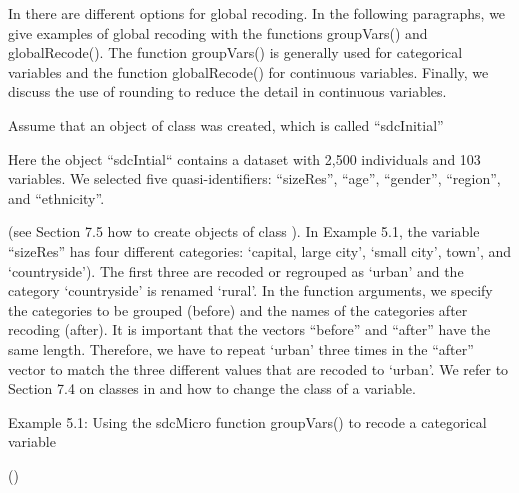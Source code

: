 \documentclass[letterpaper,10pt,english]{sphinxmanual}
\begin{document}
In  there are different options for global recoding. In the
following paragraphs, we give examples of global recoding with the
functions groupVars() and globalRecode(). The function groupVars() is
generally used for categorical variables and the function globalRecode()
for continuous variables. Finally, we discuss the use of rounding to
reduce the detail in continuous variables.


Assume that an object of class  was created, which is called
“sdcInitial” %
\begin{footnote}[2]\sphinxAtStartFootnote
Here the  object “sdcIntial“ contains a dataset with 2,500
individuals and 103 variables. We selected five quasi-identifiers:
“sizeRes”, “age”, “gender”, “region”, and “ethnicity”.
%
\end{footnote} (see Section 7.5 how to create
objects of class ). In Example 5.1, the variable “sizeRes” has
four different categories: ‘capital, large city’, ‘small city’, town’,
and ‘countryside’). The first three are recoded or regrouped as ‘urban’
and the category ‘countryside’ is renamed ‘rural’. In the function
arguments, we specify the categories to be grouped (before) and the
names of the categories after recoding (after). It is important that the
vectors “before” and “after” have the same length. Therefore, we have to
repeat ‘urban’ three times in the “after” vector to match the three
different values that are recoded to ‘urban’.  We refer to
Section 7.4 on classes in  and how to change the class of a variable.

Example 5.1: Using the sdcMicro function groupVars() to recode a
categorical variable

\begin{DUlineblock}{0em}
\item[] 
\item[] ()
\item[] 
\item[] 
\end{DUlineblock}
\end{document}
